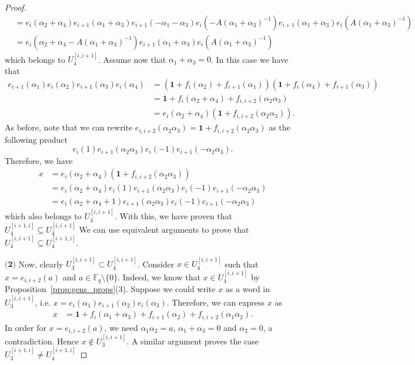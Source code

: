 \documentclass[10pt,a4paper]{amsart}
\newcommand{\FF}{\mathbb{F}}
\begin{document}
\begin{proof}
\begin{align*}
        &= e_{i}(\alpha_2+\alpha_4)e_{i+1}(\alpha_1+\alpha_3)e_{i+1}(-\alpha_1-\alpha_3)e_i(-A(\alpha_1+\alpha_3)^{-1}) e_{i+1}(\alpha_1+\alpha_3)e_i(A(\alpha_1+\alpha_3)^{-1})\\
        &= e_{i}(\alpha_2+\alpha_4-A(\alpha_1+\alpha_3)^{-1}) e_{i+1}(\alpha_1+\alpha_3)e_i(A(\alpha_1+\alpha_3)^{-1})
    \end{align*}
which belongs to $U_4^{[i,i+1]}$.
Assume now that $\alpha_1+\alpha_3=0$. In this case we have that 
\begin{align*}
e_{i+1}(\alpha_1)e_{i}(\alpha_2)e_{i+1}(\alpha_3)e_i(\alpha_4) &= (\mathbf{1}+f_i(\alpha_2)+f_{i+1}(\alpha_1))(\mathbf{1}+f_i(\alpha_4)+f_{i+1}(\alpha_3))\\
        &= \mathbf{1} + f_i(\alpha_2+\alpha_4) + f_{i,i+2}(\alpha_2\alpha_3)\\
        & = e_{i}(\alpha_2+\alpha_4)(\mathbf{1} + f_{i,i+2}(\alpha_2\alpha_3)).  
    \end{align*}
    As before, note that we can rewrite $e_{i,i+2}(\alpha_2\alpha_3)= \mathbf{1} + f_{i,i+2}(\alpha_2\alpha_3)$ as the following product $$e_{i}(1)e_{i+1}(\alpha_2\alpha_3)e_i(-1)e_{i+1}(-\alpha_2\alpha_3).$$
    Therefore, we have
\begin{align*}
        x&= e_{i}(\alpha_2+\alpha_4)(\mathbf{1} + f_{i,i+2}(\alpha_2\alpha_3))\\
        &= e_{i}(\alpha_2+\alpha_4)e_{i}(1)e_{i+1}(\alpha_2\alpha_3)e_i(-1)e_{i+1}(-\alpha_2\alpha_3)\\
        &= e_{i}(\alpha_2+\alpha_4+1)e_{i+1}(\alpha_2\alpha_3)e_i(-1)e_{i+1}(-\alpha_2\alpha_3)
    \end{align*}
which also belongs to $U_4^{[i,i+1]}$.
With this, we have proven that $U^{[i+1,i]}_4\subseteq U^{[i,i+1]}_4$
We can use equivalent arguments to prove that $U^{[i,i+1]}_4\subseteq U^{[i+1,i]}_4$.
    

    $\textbf{(2)}$ Now, clearly $U_3^{[i,i+1]}\subset U_4^{[i,i+1]}$. Consider $x\in U_4^{[i,i+1]}$ such that $x=e_{i,i+2}(a)$ and $a\in \FF_q\setminus \{ 0\}$. Indeed, we know that $x\in U_4^{[i,i+1]}$ by Proposition~\ref{prop:gens_props}(3).
    Suppose we could write $x$ as a word in $U_3^{[i,i+1]}$, i.e. $x = e_i(\alpha_1)e_{i+1}(\alpha_2)e_i(\alpha_3)$.
    Therefore, we can express $x$ as 
    \begin{align*}
        x&= \mathbf{1} + f_i(\alpha_1+\alpha_3)+f_{i+1}(\alpha_2)+f_{i,i+2}(\alpha_1\alpha_2).
    \end{align*}
    In order for $x=e_{i,i+2}(a)$, we need $\alpha_1\alpha_2=a$, $\alpha_1+\alpha_3=0$ and $\alpha_2=0$, a contradiction.
    Hence $x\notin U_3^{[i,i+1]}$.
    A similar argument proves the case $U_3^{[i+1,i]}\neq U_4^{[i+1,i]}$


\end{proof}
\end{document}
